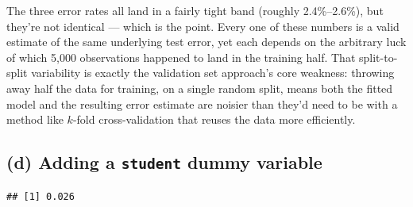\documentclass[
  11pt,
]{article}
\newenvironment{Shaded}{\begin{snugshade}}{\end{snugshade}}
\newcommand{\AttributeTok}[1]{\textcolor[rgb]{0.13,0.29,0.53}{#1}}
\newcommand{\DecValTok}[1]{\textcolor[rgb]{0.00,0.00,0.81}{#1}}
\newcommand{\FloatTok}[1]{\textcolor[rgb]{0.00,0.00,0.81}{#1}}
\newcommand{\FunctionTok}[1]{\textcolor[rgb]{0.13,0.29,0.53}{\textbf{#1}}}
\newcommand{\NormalTok}[1]{#1}
\newcommand{\OtherTok}[1]{\textcolor[rgb]{0.56,0.35,0.01}{#1}}
\newcommand{\SpecialCharTok}[1]{\textcolor[rgb]{0.81,0.36,0.00}{\textbf{#1}}}
\newcommand{\StringTok}[1]{\textcolor[rgb]{0.31,0.60,0.02}{#1}}
\begin{document}
The three error rates all land in a fairly tight band (roughly
2.4\%--2.6\%), but they're not identical --- which is the point. Every
one of these numbers is a valid estimate of the same underlying test
error, yet each depends on the arbitrary luck of which 5,000
observations happened to land in the training half. That split-to-split
variability is exactly the validation set approach's core weakness:
throwing away half the data for training, on a single random split,
means both the fitted model and the resulting error estimate are noisier
than they'd need to be with a method like \(k\)-fold cross-validation
that reuses the data more efficiently.

\subsection{\texorpdfstring{(d) Adding a \texttt{student} dummy
variable}{(d) Adding a student dummy variable}}\label{d-adding-a-student-dummy-variable}

\begin{Shaded}
\end{Shaded}

\begin{verbatim}
## [1] 0.026
\end{verbatim}
\end{document}
